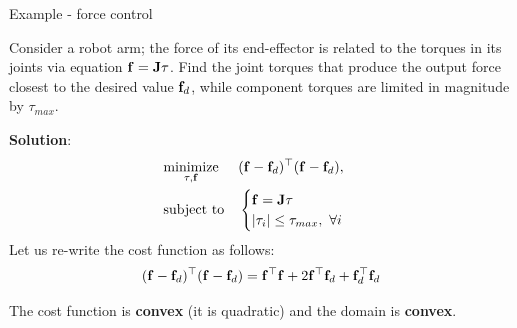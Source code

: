 \documentclass{beamer}
\begin{document}
\begin{frame}{Example - force control}
	\begin{flushleft}
		
		Consider a robot arm; the force of its end-effector is related to the torques in its joints via equation $\mathbf{f} = \mathbf{J} \tau$. Find the joint torques that produce the output force closest to the desired value $\mathbf{f}_d$, while component torques are limited in magnitude by $\tau_{max}$.
		
		\bigskip
		
		\textbf{Solution}:
		\begin{equation}
			\begin{aligned}
				& \underset{\tau, \mathbf{f}}{\text{minimize}}
				& & (\mathbf{f}-\mathbf{f}_d)^\top (\mathbf{f}-\mathbf{f}_d), \\
				& \text{subject to}
				& & \begin{cases}
					\mathbf{f} = \mathbf{J} \tau \\
					|\tau_i| \leq \tau_{max}, \ \forall i
				\end{cases}
			\end{aligned}
		\end{equation}
		Let us re-write the cost function as follows:
		\begin{align}
			(\mathbf{f}-\mathbf{f}_d)^\top (\mathbf{f}-\mathbf{f}_d) = \mathbf{f}^\top \mathbf{f} + 2 \mathbf{f}^\top\mathbf{f}_d + \mathbf{f}_d^\top \mathbf{f}_d
		\end{align}
		
		The cost function is \textbf{convex} (it is quadratic) and the domain is \textbf{convex}.
		
		
	\end{flushleft}
\end{frame}
\end{document}
